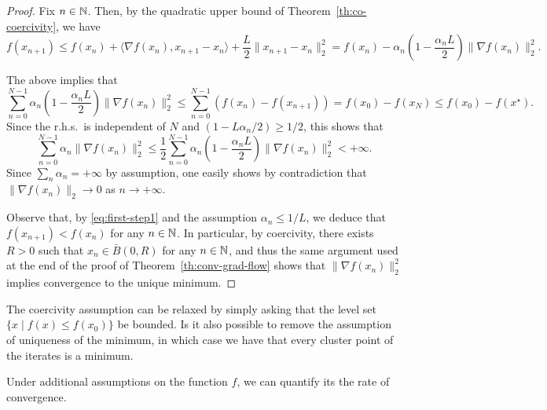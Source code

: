 \documentclass{report}
\begin{document}
\begin{proof}
	Fix $n\in\mathbb{N}$.
	Then, by the quadratic upper bound of Theorem~\ref{th:co-coercivity}, we have
	\begin{equation}
		\label{eq:first-step1}
			f(x_{n+1}) 
			\le f(x_n) + \langle \nabla f(x_n), x_{n+1}-x_n \rangle+\frac{L}2\|x_{n+1}-x_n\|_2^2
			= f(x_n)-\alpha_n \left(1-\frac{\alpha_n L}2\right) \|\nabla f(x_n)\|_2^2.
	\end{equation}

	The above implies that 
	\begin{equation}
		\sum_{n=0}^{N-1} \alpha_n \left(1-\frac{\alpha_n L}2\right) \|\nabla f(x_n)\|_2^2 \le \sum_{n=0}^{N-1} \left(f(x_{n})-f(x_{n+1})\right) =f(x_0) - f(x_N) \le f(x_0)-f(x^\star).
	\end{equation}
	Since the r.h.s.~is independent of $N$ and $(1-L\alpha_n/2) \ge 1/2$, this shows that 
	\begin{equation}
		\sum_{n=0}^{N-1} \alpha_n  \|\nabla f(x_n)\|_2^2 \le
		\frac12\sum_{n=0}^{N-1} \alpha_n \left(1-\frac{\alpha_n L}2\right) \|\nabla f(x_n)\|_2^2 < +\infty.
	\end{equation}
	Since $\sum_n \alpha_n = +\infty$ by assumption, one easily shows by contradiction that $\|\nabla f(x_n)\|_2\rightarrow 0$ as $n\to +\infty$. 

	Observe that, by \eqref{eq:first-step1} and the assumption $\alpha_n\le 1/L$, we deduce that $f(x_{n+1})<f(x_n)$ for any $n\in \mathbb{N}$. In particular, by coercivity, there exists $R>0$ such that $x_n\in \bar B(0,R)$ for any $n\in \mathbb{N}$, and thus the same argument used at the end of the proof of Theorem~\ref{th:conv-grad-flow} shows that $\|\nabla f(x_n)\|_2^2$ implies convergence to the unique minimum.
\end{proof}

\begin{remark}
	The coercivity assumption can be relaxed by simply asking that the level set $\{x\mid f(x)\le f(x_0)\}$ be bounded. 
	Is it also possible to remove the assumption of uniqueness of the minimum, in which case we have that every cluster point of the iterates is a minimum.
\end{remark}

Under additional assumptions on the function $f$, we can quantify its the rate of convergence.
\end{document}

